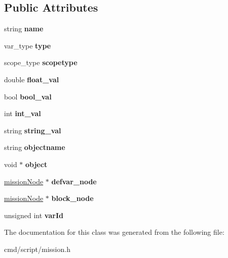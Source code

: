 \subsection*{Public Attributes}
\begin{DoxyCompactItemize}
\item 
string {\bfseries name}\hypertarget{classvarInst_a575b8d4562d82875c298c61281441652}{}\label{classvarInst_a575b8d4562d82875c298c61281441652}

\item 
var\+\_\+type {\bfseries type}\hypertarget{classvarInst_a31e720ecfd76d727dc9fedafee8a4832}{}\label{classvarInst_a31e720ecfd76d727dc9fedafee8a4832}

\item 
scope\+\_\+type {\bfseries scopetype}\hypertarget{classvarInst_a3d0ca551df33ee56308685d1fb984ba5}{}\label{classvarInst_a3d0ca551df33ee56308685d1fb984ba5}

\item 
double {\bfseries float\+\_\+val}\hypertarget{classvarInst_a1e72652651c7a3d3622603c7f2ac9f82}{}\label{classvarInst_a1e72652651c7a3d3622603c7f2ac9f82}

\item 
bool {\bfseries bool\+\_\+val}\hypertarget{classvarInst_ac616245e268816e12353867953737441}{}\label{classvarInst_ac616245e268816e12353867953737441}

\item 
int {\bfseries int\+\_\+val}\hypertarget{classvarInst_a5c3cba5bbbe59413e85371a69e01710b}{}\label{classvarInst_a5c3cba5bbbe59413e85371a69e01710b}

\item 
string {\bfseries string\+\_\+val}\hypertarget{classvarInst_a03e3a5d673263aa2eda3a6a5d893455b}{}\label{classvarInst_a03e3a5d673263aa2eda3a6a5d893455b}

\item 
string {\bfseries objectname}\hypertarget{classvarInst_aa4a7b40e8bcf468233279d2753a9a635}{}\label{classvarInst_aa4a7b40e8bcf468233279d2753a9a635}

\item 
void $\ast$ {\bfseries object}\hypertarget{classvarInst_aeb5d20cb86f33a9bc9d41fdca8de60c3}{}\label{classvarInst_aeb5d20cb86f33a9bc9d41fdca8de60c3}

\item 
\hyperlink{classmissionNode}{mission\+Node} $\ast$ {\bfseries defvar\+\_\+node}\hypertarget{classvarInst_a2067f669ac2744f8ba319ab7962d1a1a}{}\label{classvarInst_a2067f669ac2744f8ba319ab7962d1a1a}

\item 
\hyperlink{classmissionNode}{mission\+Node} $\ast$ {\bfseries block\+\_\+node}\hypertarget{classvarInst_af115517bbc281a24bd42d361c44a34b9}{}\label{classvarInst_af115517bbc281a24bd42d361c44a34b9}

\item 
unsigned int {\bfseries var\+Id}\hypertarget{classvarInst_acd523b2e7c187df57654dfce3773a70d}{}\label{classvarInst_acd523b2e7c187df57654dfce3773a70d}

\end{DoxyCompactItemize}


The documentation for this class was generated from the following file\+:\begin{DoxyCompactItemize}
\item 
cmd/script/mission.\+h\end{DoxyCompactItemize}
